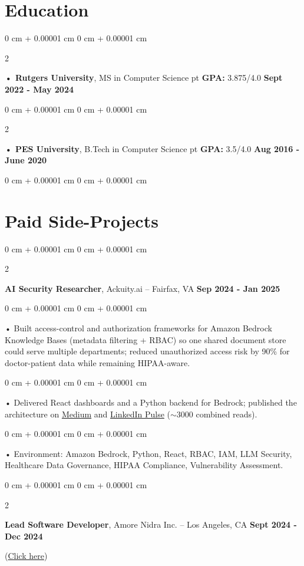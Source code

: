 \documentclass[10pt, letterpaper]{article}
\newenvironment{onecolentry}{
    \begin{adjustwidth}{
        0 cm + 0.00001 cm
    }{
        0 cm + 0.00001 cm
    }
}{
    \end{adjustwidth}
} %
\newenvironment{twocolentry}[2][]{
    \onecolentry
    \def\secondColumn{#2}
    \setcolumnwidth{\fill, 4.5 cm}
    \begin{paracol}{2}
}{
    \switchcolumn \raggedleft \secondColumn
    \end{paracol}
    \endonecolentry
} %
\begin{document}
        \section{Education}
        \vspace{2 pt }
        \begin{twocolentry}{
            \textbf{Sept 2022 - May 2024}
        }
            \textbf{ • Rutgers University}, MS in Computer Science  pt \textbf{GPA:} 3.875/4.0  \end{twocolentry}

        \begin{twocolentry}{
            \textbf{Aug 2016 - June 2020}
        }
            \textbf{ • PES University}, B.Tech in Computer Science  pt \textbf{GPA:} 3.5/4.0  \end{twocolentry}
        \begin{onecolentry}

                        \vspace{0.4cm}
    \section{Paid Side-Projects}
            \vspace{2 pt }
                    \begin{twocolentry}{
            \textbf{Sep 2024 - Jan 2025}
        }
            \textbf{AI Security Researcher}, Ackuity.ai -- Fairfax, VA\end{twocolentry}

        \begin{onecolentry}
             • Built access-control and authorization frameworks for Amazon Bedrock Knowledge Bases (metadata filtering + RBAC) so one shared document store could serve multiple departments; reduced unauthorized access risk by 90\% for doctor-patient data while remaining HIPAA-aware.
        \end{onecolentry}
        \begin{onecolentry}
             • Delivered React dashboards and a Python backend for Bedrock; published the architecture on \href{https://medium.com/@sreenikethaathreya/building-a-permission-aware-genai-application-on-amazon-bedrock-8fdc2410dd43}{Medium} and \href{https://www.linkedin.com/pulse/building-permission-aware-genai-application-amazon-bedrock-aathreya-g7nme/}{LinkedIn Pulse} ($\sim$3000 combined reads).
        \end{onecolentry}
        \begin{onecolentry}
             • Environment: Amazon Bedrock, Python, React, RBAC, IAM, LLM Security, Healthcare Data Governance, HIPAA Compliance, Vulnerability Assessment.
        \end{onecolentry}
                \vspace{0.4cm}
        \begin{twocolentry}{
            \textbf{Sept 2024 - Dec 2024}
        }
            \textbf{Lead Software Developer}, Amore Nidra Inc. -- Los Angeles, CA\end{twocolentry}(\href{https://amorenidra.com}{Click here})


\end{onecolentry}
\end{document}
